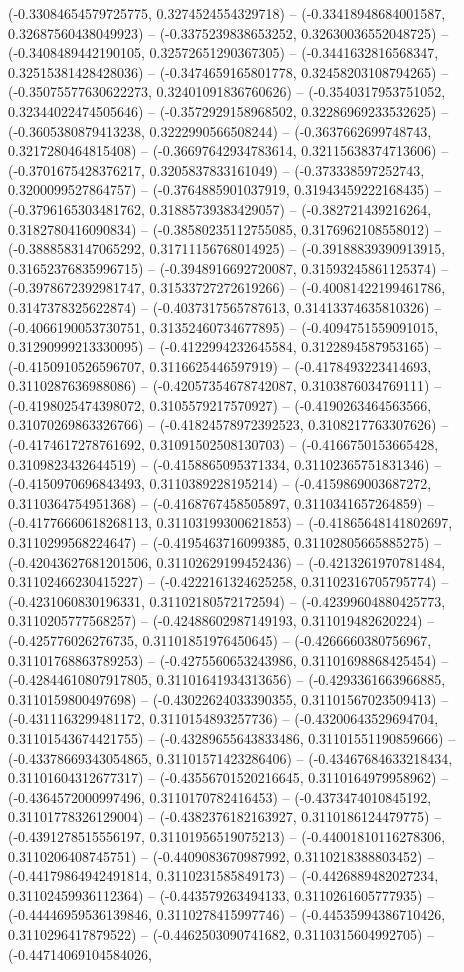 (-0.33084654579725775, 0.3274524554329718) -- (-0.33418948684001587, 0.32687560438049923) -- (-0.3375239838653252, 0.32630036552048725) -- (-0.3408489442190105, 0.32572651290367305) -- (-0.3441632816568347, 0.32515381428428036) -- (-0.3474659165801778, 0.32458203108794265) -- (-0.35075577630622273, 0.32401091836760626) -- (-0.3540317953751052, 0.32344022474505646) -- (-0.3572929158968502, 0.32286969233532625) -- (-0.3605380879413238, 0.3222990566508244) -- (-0.3637662699748743, 0.3217280464815408) -- (-0.36697642934783614, 0.32115638374713606) -- (-0.3701675428376217, 0.3205837833161049) -- (-0.373338597252743, 0.3200099527864757) -- (-0.3764885901037919, 0.31943459222168435) -- (-0.3796165303481762, 0.31885739383429057) -- (-0.382721439216264, 0.3182780416090834) -- (-0.38580235112755085, 0.3176962108558012) -- (-0.3888583147065292, 0.31711156768014925) -- (-0.39188839390913915, 0.31652376835996715) -- (-0.3948916692720087, 0.31593245861125374) -- (-0.3978672392981747, 0.31533727272619266) -- (-0.40081422199461786, 0.3147378325622874) -- (-0.4037317565787613, 0.31413374635810326) -- (-0.4066190053730751, 0.31352460734677895) -- (-0.4094751559091015, 0.31290999213330095) -- (-0.4122994232645584, 0.3122894587953165) -- (-0.4150910526596707, 0.3116625446597919) -- (-0.4178493223414693, 0.3110287636988086) -- (-0.42057354678742087, 0.3103876034769111) -- (-0.4198025474398072, 0.3105579217570927) -- (-0.4190263464563566, 0.31070269863326766) -- (-0.41824578972392523, 0.3108217763307626) -- (-0.4174617278761692, 0.31091502508130703) -- (-0.4166750153665428, 0.3109823432644519) -- (-0.4158865095371334, 0.31102365751831346) -- (-0.4150970696843493, 0.3110389228195214) -- (-0.4159869003687272, 0.3110364754951368) -- (-0.4168767458505897, 0.3110341657264859) -- (-0.41776660618268113, 0.31103199300621853) -- (-0.41865648141802697, 0.3110299568224647) -- (-0.4195463716099385, 0.31102805665885275) -- (-0.42043627681201506, 0.31102629199452436) -- (-0.4213261970781484, 0.31102466230415227) -- (-0.4222161324625258, 0.31102316705795774) -- (-0.4231060830196331, 0.31102180572172594) -- (-0.42399604880425773, 0.3110205777568257) -- (-0.42488602987149193, 0.311019482620224) -- (-0.425776026276735, 0.31101851976450645) -- (-0.4266660380756967, 0.31101768863789253) -- (-0.4275560653243986, 0.31101698868425454) -- (-0.42844610807917805, 0.31101641934313656) -- (-0.4293361663966885, 0.3110159800497698) -- (-0.43022624033390355, 0.31101567023509413) -- (-0.4311163299481172, 0.3110154893257736) -- (-0.43200643529694704, 0.31101543674421755) -- (-0.43289655643833486, 0.31101551190859666) -- (-0.43378669343054865, 0.31101571423286406) -- (-0.43467684633218434, 0.31101604312677317) -- (-0.43556701520216645, 0.3110164979958962) -- (-0.4364572000997496, 0.3110170782416453) -- (-0.4373474010845192, 0.31101778326129004) -- (-0.4382376182163927, 0.3110186124479775) -- (-0.4391278515556197, 0.31101956519075213) -- (-0.44001810116278306, 0.3110206408745751) -- (-0.4409083670987992, 0.3110218388803452) -- (-0.44179864942491814, 0.3110231585849173) -- (-0.4426889482027234, 0.31102459936112364) -- (-0.443579263494133, 0.3110261605777935) -- (-0.44446959536139846, 0.3110278415997746) -- (-0.44535994386710426, 0.3110296417879522) -- (-0.4462503090741682, 0.3110315604992705) -- (-0.44714069104584026, 